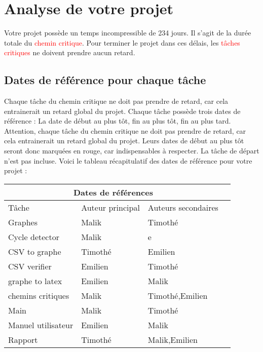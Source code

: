 \documentclass{article}
\begin{document}
\section{Analyse de votre projet}
Votre projet possède un temps incompressible de 234 jours.
    Il s'agit de la durée totale du \textcolor{red}{chemin critique}.
    Pour terminer le projet dans ces délais, les \textcolor{red}{tâches critiques} ne doivent prendre aucun retard.\subsection{Dates de référence pour chaque tâche}Chaque tâche du chemin critique ne doit pas prendre de
    retard, car cela entrainerait un retard global du projet. 
    Chaque tâche possède trois dates de référence : La date de début au plus tôt,
    fin au plus tôt, fin au plus tard.
    Attention, chaque tâche du chemin critique ne doit pas prendre de
    retard, car cela entrainerait un retard global du projet.
    Leurs dates de début au plus tôt seront donc marquées en rouge,
    car indispensables à respecter. La tâche de départ n'est pas incluse. \newpage
    Voici le tableau récapitulatif des dates de référence pour votre projet :\newline 
\begin{tabular}{ |p{3cm}||p{3cm}|p{3cm}|p{3cm}|  }
        \hline
        \multicolumn{3}{|c|}{Dates de références} \\
        \hline 
        Tâche&Auteur principal&Auteurs secondaires \\ 
        \hline 
        Graphes&Malik&Timothé \\
        Cycle detector&Malik&e  \\
        CSV to graphe&Timothé&Emilien \\
        CSV verifier&Emilien&Timothé \\
        graphe to latex&Emilien&Malik \\
        chemins critiques&Malik&Timothé,Emilien \\
        Main&Malik&Timothé \\
        Manuel utilisateur&Emilien&Malik \\
        Rapport&Timothé&Malik,Emilien \\
        \hline
    \end{tabular} 
\end{document}
